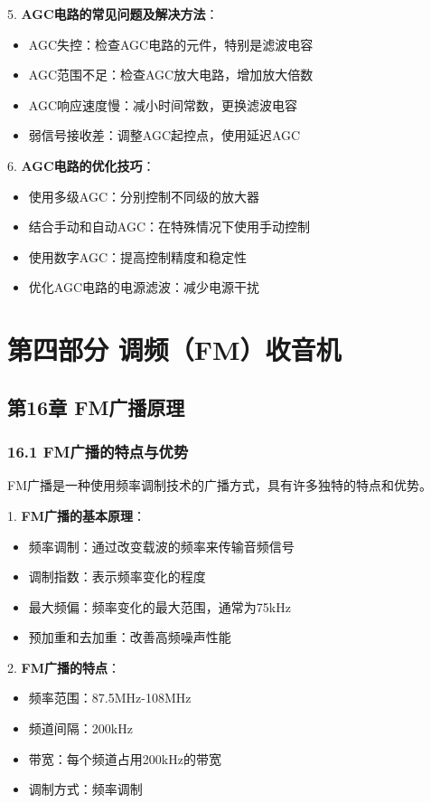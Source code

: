 \documentclass[12pt,UTF8]{ctexbook}
\begin{document}
5. \textbf{AGC电路的常见问题及解决方法}：
   \begin{itemize}[leftmargin=3.5em]
   \item AGC失控：检查AGC电路的元件，特别是滤波电容
   \item AGC范围不足：检查AGC放大电路，增加放大倍数
   \item AGC响应速度慢：减小时间常数，更换滤波电容
   \item 弱信号接收差：调整AGC起控点，使用延迟AGC
   \end{itemize}

6. \textbf{AGC电路的优化技巧}：
   \begin{itemize}[leftmargin=3.5em]
   \item 使用多级AGC：分别控制不同级的放大器
   \item 结合手动和自动AGC：在特殊情况下使用手动控制
   \item 使用数字AGC：提高控制精度和稳定性
   \item 优化AGC电路的电源滤波：减少电源干扰
   \end{itemize}

\part*{第四部分 调频（FM）收音机}

\chapter*{第16章 FM广播原理}
\section*{16.1 FM广播的特点与优势}

FM广播是一种使用频率调制技术的广播方式，具有许多独特的特点和优势。

1. \textbf{FM广播的基本原理}：
   \begin{itemize}[leftmargin=3.5em]
   \item 频率调制：通过改变载波的频率来传输音频信号
   \item 调制指数：表示频率变化的程度
   \item 最大频偏：频率变化的最大范围，通常为75kHz
   \item 预加重和去加重：改善高频噪声性能
   \end{itemize}

2. \textbf{FM广播的特点}：
   \begin{itemize}[leftmargin=3.5em]
   \item 频率范围：87.5MHz-108MHz
   \item 频道间隔：200kHz
   \item 带宽：每个频道占用200kHz的带宽
   \item 调制方式：频率调制
   \end{itemize}
\end{document}
